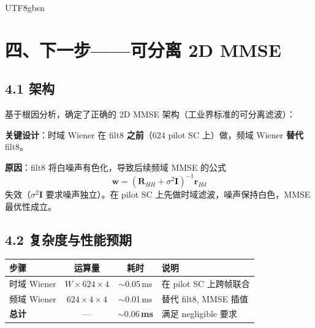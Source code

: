 \documentclass[11pt,a4paper]{article}
\begin{document}
\begin{CJK}{UTF8}{gbsn}
\section{四、下一步——可分离 2D MMSE}

\subsection{4.1 架构}

基于根因分析，确定了正确的 2D MMSE 架构（工业界标准的可分离滤波）：

\begin{center}
\end{center}

\textbf{关键设计}：时域 Wiener 在 filt8 \textbf{之前}（624 pilot SC 上）做，频域 Wiener \textbf{替代} filt8。

\textbf{原因}：filt8 将白噪声有色化，导致后续频域 MMSE 的公式
\[
\mathbf{w} = \left(\mathbf{R}_{HH} + \sigma^2 \mathbf{I}\right)^{-1} \mathbf{r}_{Hd}
\]
失效（$\sigma^2 \mathbf{I}$ 要求噪声独立）。在 pilot SC 上先做时域滤波，噪声保持白色，MMSE 最优性成立。

\subsection{4.2 复杂度与性能预期}

\begin{table}[h]\centering
\begin{tabular}{lccl}
\toprule
步骤 & 运算量 & 耗时 & 说明 \\
\midrule
时域 Wiener & $W \times 624 \times 4$ & $\sim$0.05\,ms & 在 pilot SC 上跨帧联合 \\
频域 Wiener & $624 \times 4 \times 4$ & $\sim$0.01\,ms & 替代 filt8, MMSE 插值 \\
\midrule
\textbf{总计} & --- & $\mathbf{\sim 0.06}$\,\textbf{ms} & 满足 negligible 要求 \\
\bottomrule
\end{tabular}
\end{table}


\end{CJK}
\end{document}
